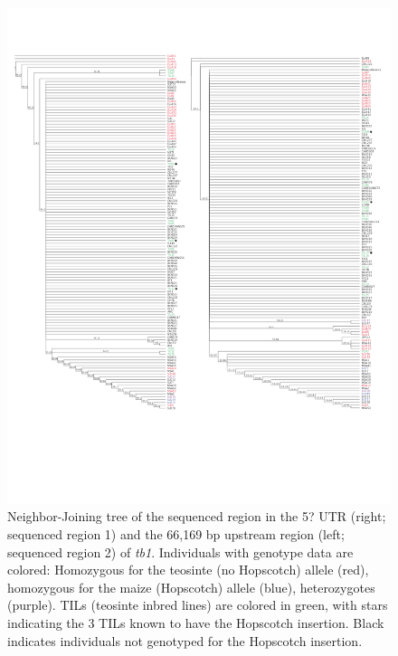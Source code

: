 \documentclass[12pt]{article}
\begin{document}
\begin{figure}[!t]
  \begin{center}
   \includegraphics[width=150mm]{FigS3NJtrees.pdf}
    \caption{Neighbor-Joining tree of the sequenced region in the 5? UTR (right; sequenced region 1) and the 66,169 bp upstream region (left; sequenced region 2) of \emph{tb1}. Individuals with genotype data are colored: Homozygous for the teosinte (no Hopscotch) allele (red), homozygous for the maize (Hopscotch) allele (blue), heterozygotes (purple). TILs (teosinte inbred lines) are colored in green, with stars indicating the 3 TILs known to have the Hopscotch insertion. Black indicates individuals not genotyped for the Hopscotch insertion.} 
\label{FigS3NJ}
  \end{center}
\end{figure}
\end{document}
